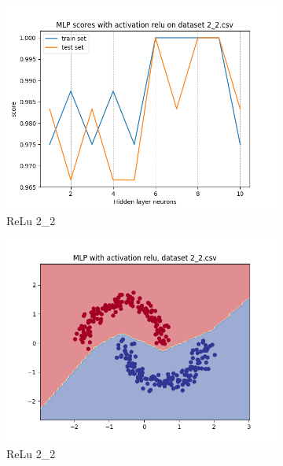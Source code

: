 \documentclass[12pt]{article}
\newcommand*{\subfigwidth}{0.24\textwidth}
\begin{document}
\begin{figure}[H]
\begin{subfigure}[t]{\subfigwidth}
        \includegraphics[width=\linewidth]{img/exp_1/mlp/2_2/relu/scores.png}
        \caption{ReLu 2\_2}
    \end{subfigure}
    \hfill
    \begin{subfigure}[t]{\subfigwidth}
        \includegraphics[width=\linewidth]{img/exp_1/mlp/2_2/relu/boundary.png}
        \caption{ReLu 2\_2}
    \end{subfigure}
    \\
    \begin{subfigure}[t]{\subfigwidth}

\end{subfigure}
\end{figure}
\end{document}
